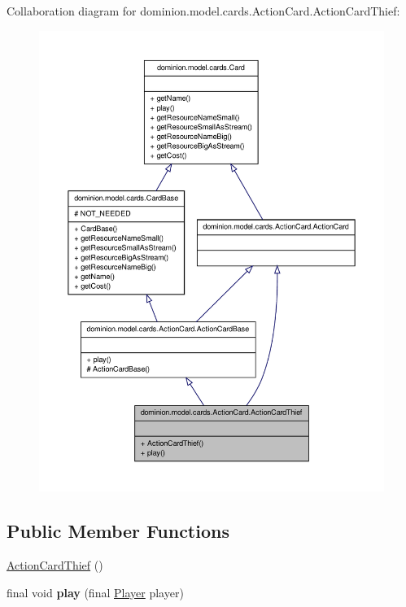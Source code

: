 \-Collaboration diagram for dominion.\-model.\-cards.\-Action\-Card.\-Action\-Card\-Thief\-:
\nopagebreak
\begin{figure}[H]
\begin{center}
\leavevmode
\includegraphics[width=350pt]{classdominion_1_1model_1_1cards_1_1ActionCard_1_1ActionCardThief__coll__graph}
\end{center}
\end{figure}
\subsection*{\-Public \-Member \-Functions}
\begin{DoxyCompactItemize}
\item 
\hyperlink{classdominion_1_1model_1_1cards_1_1ActionCard_1_1ActionCardThief_a7b1e0d3fb3cc4f712518f97d201a08a4}{\-Action\-Card\-Thief} ()
\item 
\hypertarget{classdominion_1_1model_1_1cards_1_1ActionCard_1_1ActionCardThief_ad18895795ba04562ab1d29cc4108fe0c}{final void {\bfseries play} (final \hyperlink{interfacedominion_1_1model_1_1Player}{\-Player} player)}\label{classdominion_1_1model_1_1cards_1_1ActionCard_1_1ActionCardThief_ad18895795ba04562ab1d29cc4108fe0c}

\end{DoxyCompactItemize}


